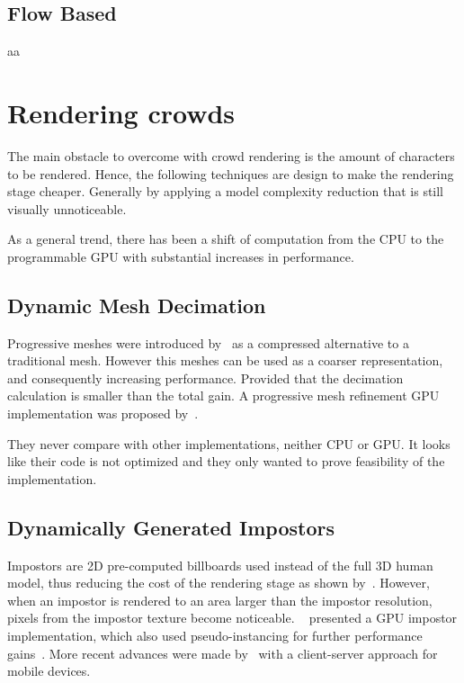 \documentclass[11pt,twocolumn]{article}
\numberwithin{equation}{section} %
\numberwithin{figure}{section} %
\numberwithin{table}{section} %
\begin{document}
\subsection{Flow Based}

aa

\section{Rendering crowds}

The main obstacle to overcome with crowd rendering is the amount of characters to be rendered.
Hence, the following techniques are design to make the rendering stage cheaper.
Generally by applying a model complexity reduction that is still visually unnoticeable.

As a general trend, there has been a shift of computation from the CPU to the programmable GPU with substantial increases in performance.

\subsection{Dynamic Mesh Decimation}

Progressive meshes were introduced by~\cite{Hoppe1996} as a compressed alternative to a traditional mesh.
However this meshes can be used as a coarser representation, and consequently increasing performance.
Provided that the decimation calculation is smaller than the total gain.
A progressive mesh refinement GPU implementation was proposed by~\cite{Hu2009}.

They never compare with other implementations, neither CPU or GPU.
It looks like their code is not optimized and they only wanted to prove feasibility of the implementation. 

\subsection{Dynamically Generated Impostors}
\label{subsec:DimGenImpostors}

Impostors are 2D pre-computed billboards used instead of the full 3D human model, thus reducing the cost of the rendering stage as shown by~\cite{Aubel2000}.
However, when an impostor is rendered to an area larger than the impostor resolution, pixels from the impostor texture become noticeable.
~\cite{Millan2006} presented a GPU impostor implementation, which also used pseudo-instancing for further performance gains~\cite{zelsnack2004glsl}.
More recent advances were made by~\cite{Ghiletiuc2013} with a client-server approach for mobile devices.
\end{document}
